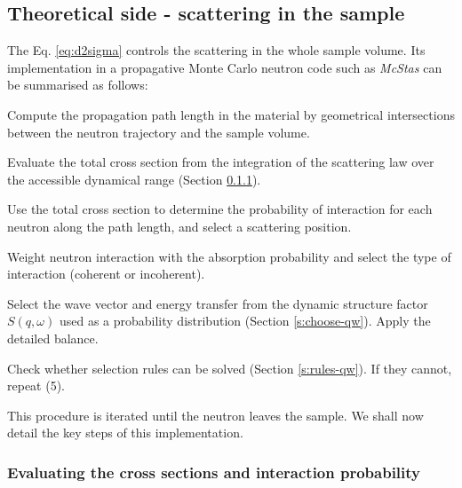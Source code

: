 \subsection{Theoretical side - scattering in the sample}

The Eq. \ref{eq:d2sigma} controls the scattering in the whole sample volume.
Its implementation in a propagative Monte Carlo neutron code such as \emph{McStas} can be summarised as follows:
\begin{enumerate}
{\item Compute the propagation path length in the material by geometrical intersections between the neutron trajectory and the sample volume.}
{\item Evaluate the total cross section from the integration of the scattering law over the accessible dynamical range (Section \ref{s:inter-proba}).}
{\item Use the total cross section to determine the probability of interaction for each neutron along the path length, and select a scattering position.}
{\item Weight neutron interaction with the absorption probability and select the type of interaction (coherent or incoherent).}
{\item Select the wave vector and energy transfer from the dynamic structure factor $S(q,\omega)$ used as a probability distribution (Section \ref{s:choose-qw}). Apply the detailed balance.}
{\item Check whether selection rules can be solved (Section \ref{s:rules-qw}). If they cannot, repeat (5).}
\end{enumerate}
This procedure is iterated until the neutron leaves the sample. We shall now detail the key steps of this implementation.

\subsubsection{Evaluating the cross sections and interaction probability}
\label{s:inter-proba}

